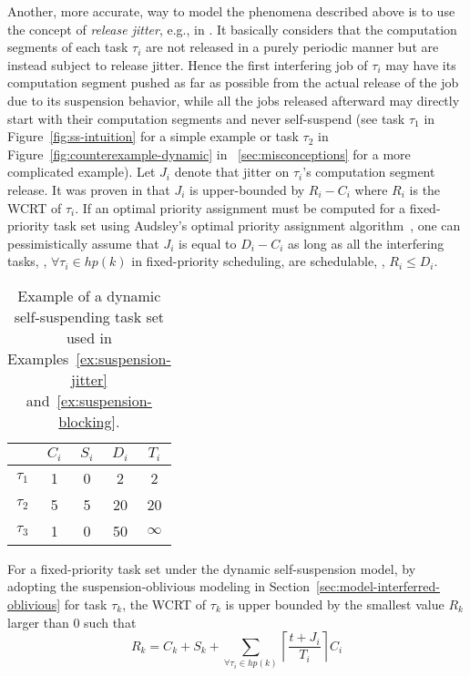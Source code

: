 \label{sec:model-interfering-jitter}

Another, more accurate, way to model the phenomena described above is to use the concept of \emph{release jitter}, e.g., in \cite{ecrts15nelissen,BletsasReport2015,huangpass:dac2015,Raj:suspension1991,ECRTS-AudsleyB04,RTAS-AudsleyB04,RTCSA-KimCPKH95}.
 It basically considers 
that the computation segments of each task $\tau_i$ are not released in a purely periodic manner but are instead subject to release jitter. 
Hence the first interfering job of $\tau_i$ may have its computation segment pushed as far as possible from the actual release of the job 
due to its suspension behavior, while all the jobs released afterward may directly start with their computation segments and never 
self-suspend (see task $\tau_1$ in Figure~\ref{fig:ss-intuition} for a simple example or task $\tau_2$ in Figure~\ref{fig:counterexample-dynamic} in \mysectionref{}~\ref{sec:misconceptions} for a more complicated example). Let $J_i$ denote that jitter on $\tau_i$'s computation segment release. 
It was proven in \cite{ecrts15nelissen,BletsasReport2015} that $J_i$ is upper-bounded by $R_i-C_i$ where $R_i$ is the WCRT of $\tau_i$. 
If an optimal priority assignment must be computed for a fixed-priority task set using Audsley's optimal priority assignment 
algorithm~\cite{Audsley1991aOPA}, one can pessimistically assume that $J_i$ is equal to $D_i-C_i$ \cite{huangpass:dac2015,Raj:suspension1991} 
as long as all the interfering tasks, \ie, $\forall \tau_i \in hp(k)$ in fixed-priority scheduling, are schedulable, \ie, $R_i \leq D_i$.


\begin{table}[t]
\centering
    \begin{tabular}{|c|c|c|c|c|}
 \hline
        & $C_i$ &  $S_i$&  $D_i$ & $T_i$\\ 
        \hline
        $\tau_1$ & 1 & 0 &  2 & 2\\ 
        $\tau_2$ &  5&  5& 20 & 20 \\ 
        $\tau_3$ & 1 & 0  & 50 & $\infty$ \\ 
        \hline
    \end{tabular} 
    \caption{Example of a dynamic self-suspending task set used in Examples~\ref{ex:suspension-jitter} and~\ref{ex:suspension-blocking}.}
    \label{table:dynamic-example}
\end{table}

For a fixed-priority task set under the dynamic self-suspension model, by adopting the suspension-oblivious modeling in Section~\ref{sec:model-interferred-oblivious} for task $\tau_k$, the WCRT of $\tau_k$ is upper bounded by the smallest value $R_k$ 
larger than $0$ such that 
\begin{equation*}
R_k=C_k+S_k+ \sum_{\forall \tau_i \in hp(k)} \left\lceil \frac{t + J_i}{T_i} \right\rceil C_i
\end{equation*} 


